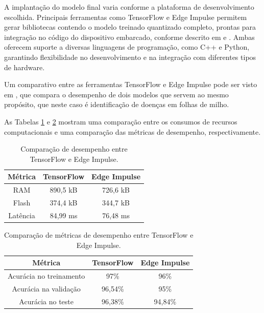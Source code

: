\documentclass[repeatfields,xlists,xpacks,oneside]{ufrgscca}
\begin{document}
A implantação do modelo final varia conforme a plataforma de desenvolvimento escolhida. Principais ferramentas como TensorFlow e Edge Impulse permitem gerar bibliotecas contendo o modelo treinado quantizado completo, prontas para integração no código do dispositivo embarcado, conforme descrito em \cite{edgeDocs} e \cite{tensorDocs}. Ambas oferecem suporte a diversas linguagens de programação, como C++ e Python, garantindo flexibilidade no desenvolvimento e na integração com diferentes tipos de hardware.

Um comparativo entre as ferramentas TensorFlow e Edge Impulse pode ser visto em \cite{EssanoahArthur2024}, que compara o desempenho de dois modelos que servem ao mesmo propósito, que neste caso é identificação de doenças em folhas de milho.

As Tabelas \ref{tab:desempenhoHardware} e \ref{tab:resultadosValidacao} mostram uma comparação entre os consumos de recursos computacionais e uma comparação das métricas de desempenho, respectivamente.

\begin{table}[H]
 \begin{center}
  \caption{Comparação de desempenho entre TensorFlow e Edge Impulse.}\label{tab:desempenhoHardware}
  \begin{tabular}{c|c|c}
  \hline
  \textbf{Métrica} & \textbf{TensorFlow} & \textbf{Edge Impulse} \\
  \hline
  RAM & 890,5 kB & 726,6 kB \\
  Flash & 374,4 kB & 344,7 kB \\
  Latência & 84,99 ms & 76,48 ms \\
  \hline
  \end{tabular}
 \end{center}
 {}
\end{table}

\begin{table}[H]
 \begin{center}
  \caption{Comparação de métricas de desempenho entre TensorFlow e Edge Impulse.}\label{tab:resultadosValidacao}
  \begin{tabular}{c|c|c}
  \hline
  \textbf{Métrica} & \textbf{TensorFlow} & \textbf{Edge Impulse} \\
  \hline
  Acurácia no treinamento & 97\% & 96\% \\
  Acurácia na validação & 96,54\% & 95\% \\
  Acurácia no teste & 96,38\% & 94,84\% \\
  \hline
  \end{tabular}
 \end{center}
\end{table}
\end{document}
